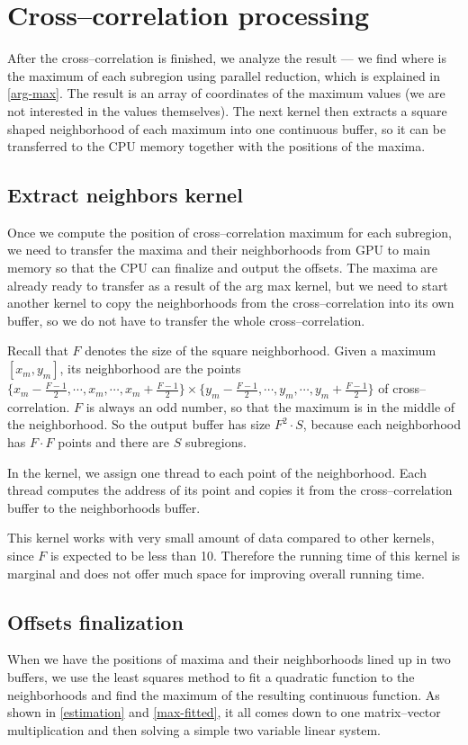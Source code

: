 \section{Cross--correlation processing}
\label{cross-processing}
After the cross--correlation is finished, we analyze the result --- we find where is the maximum of each subregion using parallel reduction, which is explained in \cref{arg-max}. The result is an array of coordinates of the maximum values (we are not interested in the values themselves). The next kernel then extracts a square shaped neighborhood of each maximum into one continuous buffer, so it can be transferred to the CPU memory together with the positions of the maxima.

\subsection{Extract neighbors kernel}

Once we compute the position of cross--correlation maximum for each subregion, we need to transfer the maxima and their neighborhoods from GPU to main memory so that the CPU can finalize and output the offsets. The maxima are already ready to transfer as a result of the arg max kernel, but we need to start another kernel to copy the neighborhoods from the cross--correlation into its own buffer, so we do not have to transfer the whole cross--correlation.

Recall that $F$ denotes the size of the square neighborhood. Given a maximum $[x_m, y_m]$, its neighborhood are the points $\{x_m - \frac{F-1}{2}, \cdots, x_m, \cdots, x_m + \frac{F-1}{2}\} \times \{y_m - \frac{F-1}{2}, \cdots, y_m, \cdots, y_m + \frac{F-1}{2}\}$ of cross--correlation. $F$ is always an odd number, so that the maximum is in the middle of the neighborhood. So the output buffer has size $F^2 \cdot S$, because each neighborhood has $F \cdot F$ points and there are $S$ subregions.

In the kernel, we assign one thread to each point of the neighborhood. Each thread computes the address of its point and copies it from the cross--correlation buffer to the neighborhoods buffer.

This kernel works with very small amount of data compared to other kernels, since $F$ is expected to be less than 10. Therefore the running time of this kernel is marginal and does not offer much space for improving overall running time.


\subsection{Offsets finalization}
\label{offsets-finalization}
When we have the positions of maxima and their neighborhoods lined up in two buffers, we use the least squares method to fit a quadratic function to the neighborhoods and find the maximum of the resulting continuous function. As shown in \cref{estimation} and \cref{max-fitted}, it all comes down to one matrix--vector multiplication and then solving a simple two variable linear system.

